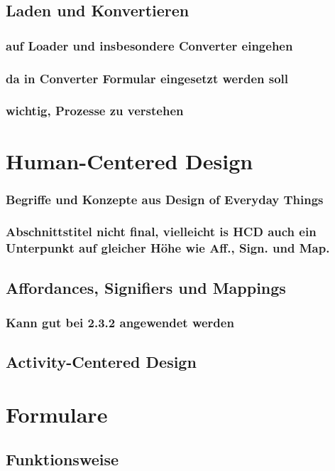 \documentclass[a4paper, 12pt, oneside, BCOR=1cm,toc=chapterentrywithdots]{scrbook}
\begin{document}
\subsection{Laden und Konvertieren}
\subsubsection{auf Loader und insbesondere Converter eingehen}
\subsubsection{da in Converter Formular eingesetzt werden soll}
\subsubsection{wichtig, Prozesse zu verstehen}

\section{Human-Centered Design}
\subsubsection{Begriffe und Konzepte aus Design of Everyday Things}
\subsubsection{Abschnittstitel nicht final, vielleicht is HCD auch ein Unterpunkt auf gleicher Höhe wie Aff., Sign. und Map.}
\subsection{Affordances, Signifiers und Mappings}
\subsubsection{Kann gut bei 2.3.2 angewendet werden}
\subsection{Activity-Centered Design}

\section{Formulare}
\cite{wroblewskiWebForm2008}
\subsection{Funktionsweise}
\end{document}
